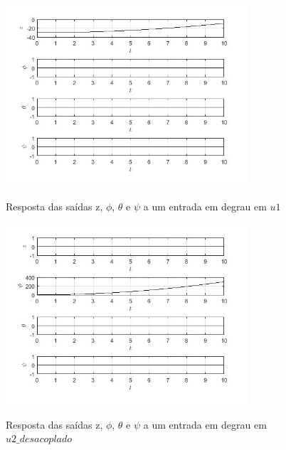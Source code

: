 \begin{figure}[!htb]
    \centering
    \caption{Resposta das saídas z, $\phi$, $\theta$ e $\psi$ a um entrada em degrau em $u1$}
    \includegraphics[width=0.8\textwidth]{./04-figuras/figuras_pos_banca/1-mostrando_desacoplamento/graphs_step_u1}
    \label{fig:graphs_step_u1}
\end{figure}

\begin{figure}[!htb]
    \centering
    \caption{Resposta das saídas z, $\phi$, $\theta$ e $\psi$ a um entrada em degrau em $u2\_desacoplado$}
    \includegraphics[width=0.8\textwidth]{./04-figuras/figuras_pos_banca/1-mostrando_desacoplamento/graphs_step_u2}
    \label{fig:graphs_step_u2}
\end{figure}

